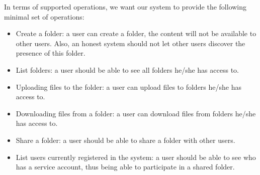 In terms of supported operations, we want our system to provide the following minimal set of operations:
\begin{itemize}
    \item Create a folder: a user can create a folder, the content will not be available to other users. Also, an honest system should not let other users discover the presence of this folder.
    \item List folders: a user should be able to see all folders he/she has access to.
    \item Uploading files to the folder: a user can upload files to folders he/she has access to.
    \item Downloading files from a folder: a user can download files from folders he/she has access to.
    \item Share a folder: a user should be able to share a folder with other users.
    \item List users currently registered in the system: a user should be able to see who has a service account, thus being able to participate in a shared folder.
\end{itemize}


